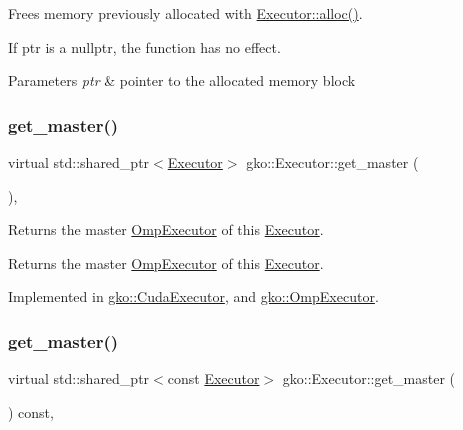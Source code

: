 Frees memory previously allocated with \hyperlink{classgko_1_1Executor_a5a216c2b1f7ceb8a0190c08941c1c687}{Executor\+::alloc()}. 

If {\ttfamily ptr} is a {\ttfamily nullptr}, the function has no effect.


\begin{DoxyParams}{Parameters}
{\em ptr} & pointer to the allocated memory block \\
\hline
\end{DoxyParams}
\mbox{\label{classgko_1_1Executor_acaec4f999d52fc71e5e5a3d3ad93609c}} 
\subsubsection{\texorpdfstring{get\+\_\+master()}{get\_master()}\hspace{0.1cm}{\footnotesize\ttfamily [1/2]}}
{\footnotesize\ttfamily virtual std\+::shared\+\_\+ptr$<$\hyperlink{classgko_1_1Executor}{Executor}$>$ gko\+::\+Executor\+::get\+\_\+master (\begin{DoxyParamCaption}{ }\end{DoxyParamCaption})\hspace{0.3cm}{\ttfamily [pure virtual]}, {\ttfamily [noexcept]}}



Returns the master \hyperlink{classgko_1_1OmpExecutor}{Omp\+Executor} of this \hyperlink{classgko_1_1Executor}{Executor}. 

\begin{DoxyReturn}{Returns}
the master \hyperlink{classgko_1_1OmpExecutor}{Omp\+Executor} of this \hyperlink{classgko_1_1Executor}{Executor}. 
\end{DoxyReturn}


Implemented in \hyperlink{classgko_1_1CudaExecutor_a59a618e0d48b42fe699e9d4cf347b491}{gko\+::\+Cuda\+Executor}, and \hyperlink{classgko_1_1OmpExecutor_a5b83349e601d473cf8768c0bdbcaca8c}{gko\+::\+Omp\+Executor}.

\mbox{\label{classgko_1_1Executor_a261386e439c8daa6e0d95dc331b9bfeb}} 
\subsubsection{\texorpdfstring{get\+\_\+master()}{get\_master()}\hspace{0.1cm}{\footnotesize\ttfamily [2/2]}}
{\footnotesize\ttfamily virtual std\+::shared\+\_\+ptr$<$const \hyperlink{classgko_1_1Executor}{Executor}$>$ gko\+::\+Executor\+::get\+\_\+master (\begin{DoxyParamCaption}{ }\end{DoxyParamCaption}) const\hspace{0.3cm}{\ttfamily [pure virtual]}, {\ttfamily [noexcept]}}



